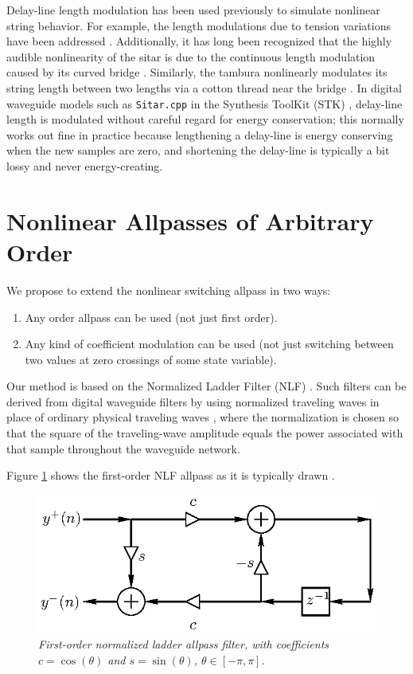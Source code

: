 \documentclass[twoside,a4paper]{article}
\begin{document}
Delay-line length modulation has been used previously to simulate
nonlinear string behavior.  For example, the length modulations due to
tension variations have been addressed \cite{TolonenEtAl00}.
Additionally, it has long been recognized that the highly audible
nonlinearity of the sitar is due to the continuous length modulation
caused by its curved bridge \cite{FletcherAndRossing98}.  Similarly,
the tambura nonlinearly modulates its string length between two
lengths via a cotton thread near the bridge
\cite{FletcherAndRossing98}.  In digital waveguide models such as
\texttt{Sitar.cpp} in the Synthesis ToolKit (STK) \cite{STK4},
delay-line length is modulated without careful regard for energy
conservation; this normally works out fine in practice because
lengthening a delay-line is energy conserving when the new samples
are zero, and shortening the delay-line is typically a bit lossy
and never energy-creating.

\section{Nonlinear Allpasses of Arbitrary Order}

We propose to extend the nonlinear switching allpass in two ways:
\begin{enumerate}
\item Any order allpass can be used (not just first order).
\item Any kind of coefficient modulation can be used (not just
  switching between two values at zero crossings of some state variable).
\end{enumerate}
Our method is based on the Normalized Ladder Filter (NLF)
\cite{GrayAndMarkel75}. Such filters can be derived from digital
waveguide filters by using normalized traveling waves in place of
ordinary physical traveling waves \cite{PASP}, where the normalization
is chosen so that the square of the traveling-wave amplitude equals
the power associated with that sample throughout the waveguide
network.

Figure \ref{nlf} shows the first-order NLF allpass as it is typically
drawn \cite{MG,PASP}.

\begin{figure}[ht]
\centerline{\includegraphics{eps/nlf.eps}}
\caption{\label{nlf}{\it First-order normalized ladder allpass filter, with
coefficients $c=\cos(\theta)$ and $s=\sin(\theta)$, $\theta\in[-\pi,\pi]$.}}
\end{figure}
\end{document}
